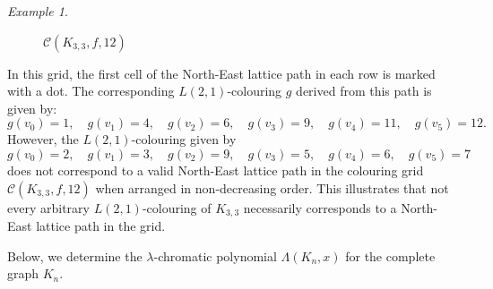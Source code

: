 \documentclass{birkjour}
\theoremstyle{definition}
\theoremstyle{remark}
\newtheorem*{example}{Example}
\numberwithin{equation}{section}
\begin{document}
\begin{example}
\begin{figure}[h]
\vskip 0.2cm
\caption{$\mathcal{C}(K_{3,3},f,12)$}
\label{fig:coloring-K33}
\end{figure}

In this grid, the first cell of the North-East lattice path in each row is marked with a dot. The corresponding \( L(2,1) \)-colouring \( g \) derived from this path is given by:
\[
g(v_0) = 1, \quad g(v_1) = 4, \quad g(v_2) = 6, \quad g(v_3) = 9, \quad g(v_4) = 11, \quad g(v_5) = 12.
\]
However, the \( L(2,1) \)-colouring given by
\[
g(v_0) = 2, \quad g(v_1) = 3, \quad g(v_2) = 9, \quad g(v_3) = 5, \quad g(v_4) = 6, \quad g(v_5) = 7
\]
does not correspond to a valid North-East lattice path in the colouring grid \( \mathcal{C}(K_{3,3}, f, 12) \) when arranged in non-decreasing order. This illustrates that not every arbitrary \( L(2,1) \)-colouring of \( K_{3,3} \) necessarily corresponds to a North-East lattice path in the grid.
\end{example}
Below, we determine the \( \lambda \)-chromatic polynomial \( \Lambda(K_n, x) \) for the complete graph \( K_n \).
\end{document}
